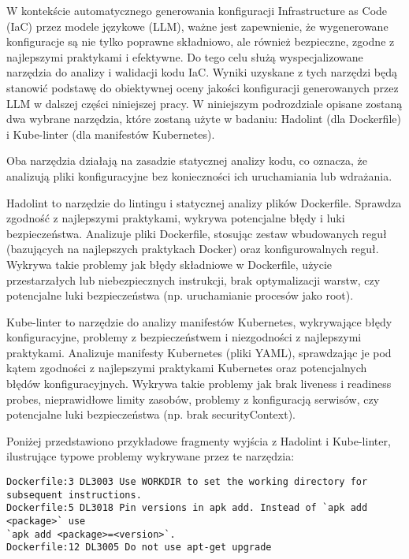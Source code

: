 W kontekście automatycznego generowania konfiguracji Infrastructure as Code (IaC) przez modele językowe (LLM), ważne jest zapewnienie, że wygenerowane konfiguracje są nie tylko poprawne składniowo, ale również bezpieczne, zgodne z najlepszymi praktykami i efektywne. Do tego celu służą wyspecjalizowane narzędzia do analizy i walidacji kodu IaC. Wyniki uzyskane z tych narzędzi będą stanowić podstawę do obiektywnej oceny jakości konfiguracji generowanych przez LLM w dalszej części niniejszej pracy. W niniejszym podrozdziale opisane zostaną dwa wybrane narzędzia, które zostaną użyte w badaniu: Hadolint \cite{hadolint} (dla Dockerfile) i Kube-linter \cite{kubelinter} (dla manifestów Kubernetes).

Oba narzędzia działają na zasadzie statycznej analizy kodu, co oznacza, że analizują pliki konfiguracyjne bez konieczności ich uruchamiania lub wdrażania.

Hadolint to narzędzie do lintingu i statycznej analizy plików Dockerfile. Sprawdza zgodność z najlepszymi praktykami, wykrywa potencjalne błędy i luki bezpieczeństwa. Analizuje pliki Dockerfile, stosując zestaw wbudowanych reguł (bazujących na najlepszych praktykach Docker) oraz konfigurowalnych reguł. Wykrywa takie problemy jak błędy składniowe w Dockerfile, użycie przestarzałych lub niebezpiecznych instrukcji, brak optymalizacji warstw, czy potencjalne luki bezpieczeństwa (np. uruchamianie procesów jako root).

Kube-linter to narzędzie do analizy manifestów Kubernetes, wykrywające błędy konfiguracyjne, problemy z bezpieczeństwem i niezgodności z najlepszymi praktykami. Analizuje manifesty Kubernetes (pliki YAML), sprawdzając je pod kątem zgodności z najlepszymi praktykami Kubernetes oraz potencjalnych błędów konfiguracyjnych. Wykrywa takie problemy jak brak liveness i readiness probes, nieprawidłowe limity zasobów, problemy z konfiguracją serwisów, czy potencjalne luki bezpieczeństwa (np. brak securityContext).

Poniżej przedstawiono przykładowe fragmenty wyjścia z Hadolint i Kube-linter, ilustrujące typowe problemy wykrywane przez te narzędzia:

\begin{lstlisting}[caption={Przykład wyników Hadolint},label={lst:example-hadolint},captionpos=b,columns=fullflexible, breaklines=true]
Dockerfile:3 DL3003 Use WORKDIR to set the working directory for subsequent instructions.
Dockerfile:5 DL3018 Pin versions in apk add. Instead of `apk add <package>` use
`apk add <package>=<version>`.
Dockerfile:12 DL3005 Do not use apt-get upgrade
\end{lstlisting}

